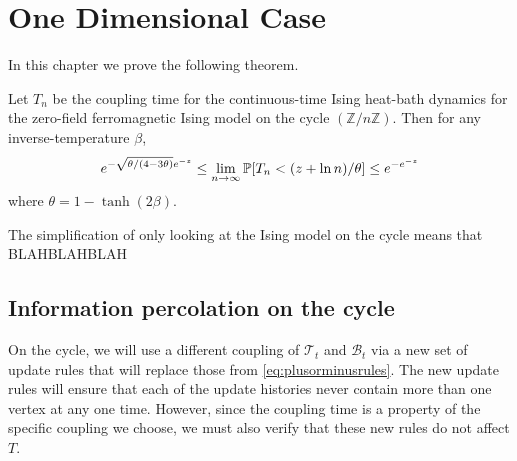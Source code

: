 \chapter{One Dimensional Case}
\label{Ch:1D}


	In this chapter we prove the following theorem.

	\begin{theorem}
	\label{thm:Coupling Distribution on Cycle}
		Let $T_n$ be the coupling time for the continuous-time Ising heat-bath 
		dynamics for the zero-field ferromagnetic Ising model on the cycle 
		$(\mathbb{Z} / n\mathbb{Z})$. Then for any inverse-temperature $\beta$,
		\begin{equation}
			e^{-\sqrt{\theta/(4 - 3\theta)}e^{-z}} \leq \lim_{n \rightarrow \infty} \mathbb{P}[T_n < (z + \ln n)/\theta] \leq e^{-e^{-z}}
		\end{equation}
		where $\theta = 1 - \tanh(2\beta)$.
	\end{theorem}

	The simplification of only looking at the Ising model on the cycle means that BLAHBLAHBLAH

	\section{Information percolation on the cycle}
	\label{sec:information percolation on the cycle}
	On the cycle, we will use a different coupling of $\mathscr{T}_t$ and $\mathscr{B}_t$ via a new set of update rules that will replace those from \eqref{eq:plusorminusrules}. The new update rules will ensure that each of the update histories never contain more than one vertex at any one time. However, since the coupling time is a property of the specific coupling we choose, we must also verify that these new rules do not affect $T$. 

